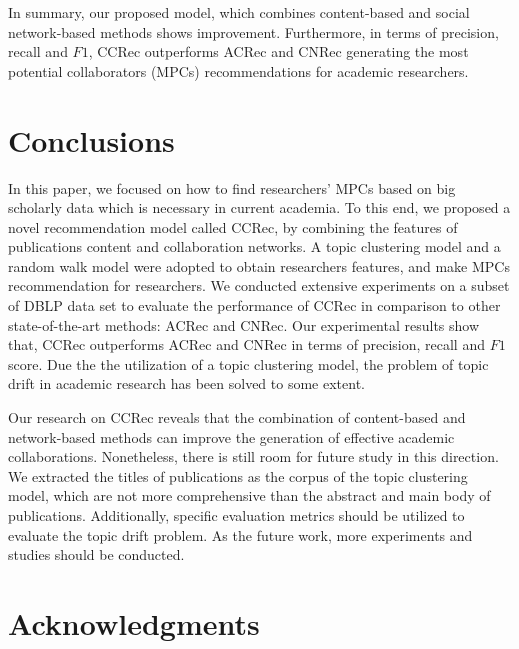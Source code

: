 \documentclass[10pt,letterpaper]{article}
\begin{document}
In summary, our proposed model, which combines content-based and social network-based methods shows improvement. Furthermore, in terms of precision, recall and $F1$, CCRec outperforms ACRec and CNRec generating the most potential collaborators (MPCs) recommendations for academic researchers.

\section*{Conclusions}
In this paper, we focused on how to find researchers' MPCs based on big scholarly data which is necessary in current academia. To this end, we proposed a novel recommendation model called CCRec, by combining the features of publications content and collaboration networks. A topic clustering model and a random walk model were adopted to obtain researchers features, and make MPCs recommendation for researchers. We conducted extensive experiments on a subset of DBLP data set to evaluate the performance of CCRec in comparison to other state-of-the-art methods: ACRec and CNRec. Our experimental results show that, CCRec outperforms ACRec and CNRec in terms of precision, recall and $F1$ score. Due the the utilization of a topic clustering model, the problem of topic drift in academic research has been solved to some extent.

Our research on CCRec reveals that the combination of content-based and network-based methods can improve the generation of effective academic collaborations. Nonetheless, there is still room for future study in this direction. We extracted the titles of publications as the corpus of the topic clustering model, which are not more comprehensive than the abstract and main body of publications. Additionally, specific evaluation metrics should be utilized to evaluate the topic drift problem. As the future work, more experiments and studies should be conducted.

\section*{Acknowledgments}

\nolinenumbers

%
%
%
\end{document}
